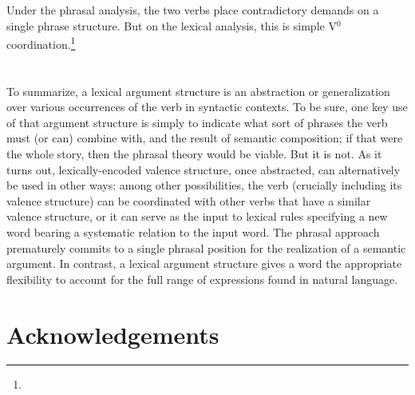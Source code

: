 \documentclass[output=paper
 	        ,biblatex
                ,babelshorthands
                ,newtxmath
                ,draftmode
                ,colorlinks, citecolor=brown
]{langscibook}
\begin{document}
\noindent
Under the phrasal analysis, the two verbs place contradictory demands on a single phrase structure.  But on the lexical analysis, this is simple V$^0$ coordination.\footnote{%
}

\section{}
 
To summarize, a lexical argument structure is an abstraction or generalization over various occurrences of the verb in syntactic contexts. To be sure, one key use of that argument structure is simply to indicate what sort of phrases the verb must (or can) combine with, and the result of semantic composition; if that were the whole story, then the phrasal theory would be viable. But it is not. As it turns out, lexically-encoded valence structure, once abstracted, can alternatively be used in other ways: among other possibilities, the verb (crucially including its valence structure) can be coordinated with other verbs that have a similar valence structure, or it can serve as the input to lexical rules specifying a new word  bearing a systematic relation to the input word.   The phrasal approach prematurely commits to a single phrasal position for the realization of 
a semantic argument.  In contrast, a lexical argument structure gives a word the appropriate flexibility to account for the full range of expressions found in natural language.   
 

\section*{Acknowledgements}


%
{\sloppy
\printbibliography[heading=subbibliography,notkeyword=this] 
}
\end{document}
